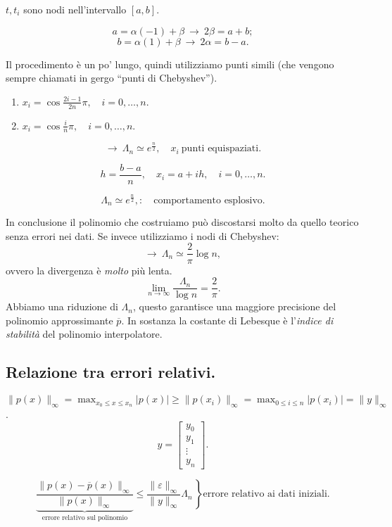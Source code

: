 $t, t_i$ sono nodi nell'intervallo $[a,b]$.

\[
a = \alpha(-1) + \beta \ \longrightarrow \ 2\beta = a+b;
\]
\[
b = \alpha(1) + \beta \ \longrightarrow \ 2\alpha = b-a.
\]

Il procedimento è un po' lungo, quindi utilizziamo punti simili (che vengono
sempre chiamati in gergo ``punti di Chebyshev'').
\begin{enumerate}
\item $x_i = \cos \frac{2i - 1}{2n} \pi, \quad i = 0,\ldots, n.$
\item $x_i = \cos \frac{i}{n} \pi, \quad i = 0,\ldots, n.$
\end{enumerate}
\[
\longrightarrow \ \Lambda_n \simeq e^{\frac{n}{2}}, \quad x_i \ \textrm{punti
equispaziati.}
\]

\[h = \frac{b-a}{n}, \quad x_i = a +ih, \quad i = 0,\ldots,n.\]

\[
\Lambda_n \simeq e^{\frac{n}{2}}, \colon\quad \textrm{comportamento esplosivo.}
\]

In conclusione il polinomio che costruiamo può discostarsi molto da quello
teorico senza errori nei dati. Se invece utilizziamo i nodi di Chebyshev:
\[\longrightarrow \ \Lambda_n \simeq \frac{2}{\pi}\log n,\]
ovvero la divergenza è \emph{molto} più lenta.
\[\lim_{n \to \infty}\frac{\Lambda_n}{\log n}  =
\frac{2}{\pi}.\]
Abbiamo una riduzione di $\Lambda_n$, questo garantisce una maggiore
precisione del polinomio approssimante $\overline{p}$. In sostanza la costante
di Lebesque è l'\emph{indice di stabilità} del polinomio interpolatore.

\subsection{Relazione tra errori relativi.}
$\|p(x)\|_{\infty} = \displaystyle
\max_{x_0 \leq x \leq x_n}|p(x)| \geq \|p(x_i)\|_{\infty} =
\max_{0 \leq i \leq n}|p(x_i)| = \|y\|_{\infty}$.
\[y = \left[
\begin{array}{c}
y_0 \\
y_1 \\
\vdots \\
y_n
\end{array}\right].
\]

\begin{osse}

\[
\underbrace{\frac{\|p(x) - \overline{p}(x)\|_{\infty}}{\|p(x)\|_{\infty}}
}_{\textrm{errore relativo sul polinomio}} \leq \left.\frac{\|\varepsilon\|_\infty}{\|y
\|_{\infty}}\Lambda_n\,\right\}\textrm{errore relativo ai dati iniziali.}
\]
\end{osse}

